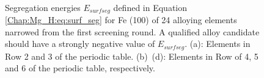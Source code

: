 \newpage
\begingroup
\begin{figure}[!ht]
  \centering
  \label{Chap:Mg_H:fig:6a}
  \label{Chap:Mg_H:fig:6b}
  \\
  \label{Chap:Mg_H:fig:6c}
  \label{Chap:Mg_H:fig:6d}
\caption[Surface segregation energies for Fe (100) of 24 alloying elements]{Segregation energies $E_{surf seg}$ defined in Equation \ref{Chap:Mg_H:eq:surf_seg} for Fe (100) of 24 alloying elements narrowed from the first screening round. A qualified alloy candidate should have a strongly negative value of $E_{surf seg}$. (a): Elements in Row 2 and 3 of the periodic table. (b)~(d): Elements in Row of 4, 5 and 6 of the periodic table, respectively.}
  \label{Chap:Mg_H:fig6}
\end{figure}
\endgroup

